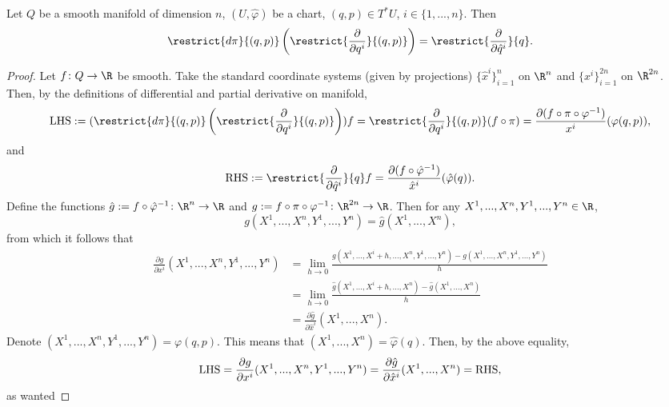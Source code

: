 \begin{proposition}
  Let
    $Q$ be a smooth manifold of dimension $n$,
    $(U, \hat{\varphi})$ be a chart,
    $(q, p) \in T^* U$,
    $ i \in \{1, ..., n\}$.
  Then
  \begin{equation}
    \restrict{d \pi}{(q, p)}
    \left(\restrict{\frac{\partial}{\partial q^i}}{(q, p)}\right)
    = \restrict{\frac{\partial}{\partial \hat{q}^i}}{q}.
  \end{equation}
\end{proposition}
\begin{proof}
  Let $f \colon Q \to \R$ be smooth.
  Take the standard coordinate systems (given by projections)
  $\{\hat{x}^i\}_{i = 1}^n$ on $\R^n$ and
  $\{x^i\}_{i = 1}^{2 n}$ on $\R^{2 n}$.
  Then, by the definitions of differential and partial derivative on manifold,
  \begin{equation}
    {\rm LHS}
    := (\restrict{d \pi}{(q, p)}
      \left(\restrict{\frac{\partial}{\partial q^i}}{(q, p)}\right)) f
    = \restrict{\frac{\partial}{\partial q^i}}{(q, p)}(f \circ \pi)
    = \frac{\partial(f \circ \pi \circ \varphi^{-1})}{x^i}(\varphi(q, p)),
  \end{equation}
  and
  \begin{equation}
    {\rm RHS}
    := \restrict{\frac{\partial}{\partial \hat{q}^i}}{q} f
    = \frac{\partial(f \circ \hat{\varphi}^{-1})}{\hat{x}^i}(\hat{\varphi}(q)).
  \end{equation}
  Define the functions
  $\hat{g} := f \circ \hat{\varphi}^{-1} \colon \R^n \to \R$ and
  $g := f \circ \pi \circ \varphi^{-1} \colon \R^{2 n} \to \R$.
  Then for any $X^1, ..., X^n, Y^1, ..., Y^n \in \R$,
  \begin{equation}
    g(X^1, ..., X^n, Y^1, ..., Y^n) = \hat{g}(X^1, ..., X^n),
  \end{equation}
  from which it follows that
  \begin{equation}
    \begin{split}
      \frac{\partial g}{\partial x^i}(X^1, ..., X^n, Y^1, ..., Y^n)
      & = \lim_{h \to 0}
        \frac
        {g(X^1, ..., X^i + h, ..., X^n, Y^1, ..., Y^n)
         - g(X^1, ..., X^n, Y^1, ..., Y^n)}
        {h} \\
      & = \lim_{h \to 0}
        \frac{\hat{g}(X^1, ..., X^i + h, ..., X^n) - \hat{g}(X^1, ..., X^n)}{h}
        \\
      & = \frac{\partial \hat{g}}{\partial \hat{x}^i}(X^1, ..., X^n).
    \end{split}
  \end{equation}
  Denote $(X^1, ..., X^n, Y^1, ..., Y^n) = \varphi(q, p)$.
  This means that $(X^1, ..., X^n) = \hat{\varphi}(q)$.
  Then, by the above equality,
  \begin{equation}
    {\rm LHS}
    = \frac{\partial g}{\partial x^i}(X^1, ..., X^n, Y^1, ..., Y^n)
    = \frac{\partial \hat{g}}{\partial \hat{x}^i}(X^1, ..., X^n)
    = {\rm RHS},
  \end{equation}
  as wanted
\end{proof}
